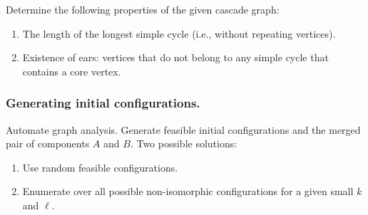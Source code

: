 \documentclass[a4paper,USenglish]{lipics-v2019}
\begin{document}
Determine the following properties of the given cascade graph:
\begin{enumerate}
    \item The length of the longest simple cycle (i.e., without repeating
        vertices).
    \item Existence of ears: vertices that do not belong to any simple cycle
        that contains a core vertex.
\end{enumerate}

\subsubsection{Generating initial configurations.}

Automate graph analysis. Generate feasible initial configurations and the
merged pair of components $A$ and $B$. Two
possible solutions:
\begin{enumerate}
    \item Use
random feasible configurations.
\item Enumerate over all possible non-isomorphic configurations for a given small $k$
    and $\ell$.
\end{enumerate}

  
  


\appendix
\end{document}
